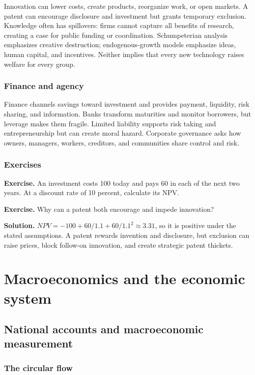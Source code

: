 \documentclass[11pt,oneside,openany]{book}
\newcommand{\exercise}[1]{\textbf{Exercise.} #1}
\newcommand{\solution}[1]{\textbf{Solution.} #1}
\begin{document}
Innovation can lower costs, create products, reorganize work, or open markets. A patent can encourage disclosure and investment but grants temporary exclusion. Knowledge often has spillovers: firms cannot capture all benefits of research, creating a case for public funding or coordination. Schumpeterian analysis emphasizes creative destruction; endogenous-growth models emphasize ideas, human capital, and incentives. Neither implies that every new technology raises welfare for every group.

\section{Finance and agency}

Finance channels savings toward investment and provides payment, liquidity, risk sharing, and information. Banks transform maturities and monitor borrowers, but leverage makes them fragile. Limited liability supports risk taking and entrepreneurship but can create moral hazard. Corporate governance asks how owners, managers, workers, creditors, and communities share control and risk.

\section{Exercises}

\exercise{An investment costs 100 today and pays 60 in each of the next two years. At a discount rate of 10 percent, calculate its NPV.}

\exercise{Why can a patent both encourage and impede innovation?}

\solution{$NPV=-100+60/1.1+60/1.1^2\approx3.31$, so it is positive under the stated assumptions. A patent rewards invention and disclosure, but exclusion can raise prices, block follow-on innovation, and create strategic patent thickets.}

\part{Macroeconomics and the economic system}

\chapter{National accounts and macroeconomic measurement}
\label{ch:accounts}

\section{The circular flow}
\end{document}
